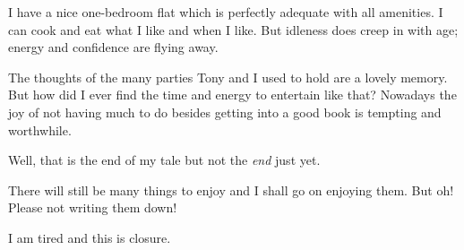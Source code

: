 I have a nice one-bedroom flat which is perfectly adequate with all
amenities. I can cook and eat what I like and when I like. But
idleness does creep in with age; energy and confidence are flying
away.

The thoughts of the many parties Tony and I used to hold are a lovely
memory. But how did I ever find the time and energy to entertain like
that? Nowadays the joy of not having much to do besides getting into a
good book is tempting and worthwhile.

Well, that is the end of my tale but not the \textit{end} just yet.

There will still be many things to enjoy and I shall go on enjoying
them. But oh! Please not writing them down!

I am tired and this is closure.

